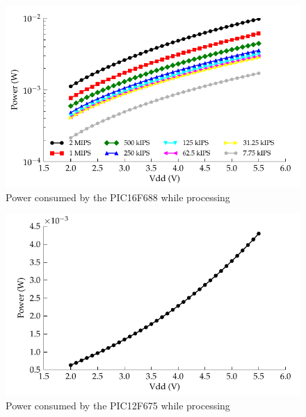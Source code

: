       \begin{figure}
        \centering
        \includegraphics{content/pt1/03-EnergyRequirements/graphics/Graph_PIC16F688_Clock_Power}
        \caption{\label{graph:CLK_POWER_16F688}Power consumed by the PIC16F688 while processing}
      \end{figure}

      \begin{figure}
      \centering
        \includegraphics{content/pt1/03-EnergyRequirements/graphics/Graph_PIC12F675_Clock_Power}
        \caption{\label{graph:CLK_POWER_12F675-1}Power consumed by the PIC12F675 while processing}
      \end{figure}

